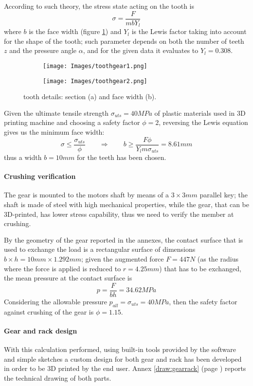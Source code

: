 	According to such theory, the stress state acting on the tooth is
	\[ \sigma = \frac{F}{mb Y_l}\]
	where $b$ is the face width (figure \ref{fig:tooth}) and $Y_l$ is the Lewis factor taking into account for the shape of the tooth; such parameter depends on both the number of teeth $z$ and the pressure angle $\alpha$, and for the given data it evaluates to $Y_l = 0.308$.
	\begin{figure}[bt]
	\begin{subfigure}{.5\textwidth}
		\centering
		\texttt{[image: Images/toothgear1.png]}
		\caption{}
	\end{subfigure}%
	\begin{subfigure}{.5\textwidth}
		\centering
		\texttt{[image: Images/toothgear2.png]}
		\caption{}
	\end{subfigure}
	\caption{tooth details: section (a) and face width (b).}
	\label{fig:tooth}
	\end{figure}
	
	Given the ultimate tensile strength $\sigma_{uts} = 40MPa$ of plastic materials used in 3D printing machine and choosing a safety factor $\phi= 2$, reversing the Lewis equation gives us the minimum face width:
	\[ \sigma \leq \frac{\sigma_{uts}}{\phi} \qquad \Rightarrow \qquad b \geq \frac{F \phi}{Y_l m \sigma_{uts}} = 8.61mm \]
	thus a width $b = 10mm$ for the teeth has been chosen.
	
	\paragraph{Crushing verification} The gear is mounted to the motors shaft by means of a $3\times 3mm$ parallel key; the shaft is made of steel with high mechanical properties, while the gear, that can be 3D-printed, has lower stress capability, thus we need to verify the member at crushing.
	
	By the geometry of the gear reported in the annexes, the contact surface that is used to exchange the load is a rectangular surface of dimensions $b\times h = 10 mm \times 1.292mm$; given the augmented force $F = 447N$ (as the radius where the force is applied is reduced to $r = 4.25mm$) that has to be exchanged, the mean pressure at the contact surface is
	\[ p = \frac{F}{bh} = 34.62MPa \]
	Considering the allowable pressure $p_{all} = \sigma_{uts} = 40MPa$, then the safety factor against crushing of the gear is $\phi = 1.15$.
	
	\paragraph{Gear and rack design} With this calculation performed, using built-in tools provided by the software and simple sketches a custom design for both gear and rack has been developed in order to be 3D printed by the end user. Annex \ref{draw:gearrack} (page \pageref{draw:gearrack}) reports the technical drawing of both parts.
	
